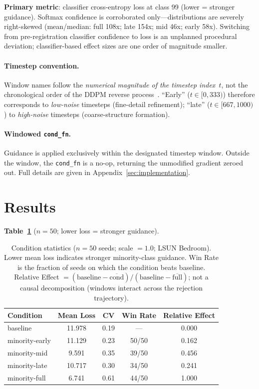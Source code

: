 \documentclass[10pt]{article}
\begin{document}
\textbf{Primary metric}: classifier cross-entropy loss at class 99 (lower =
stronger guidance).  Softmax confidence is corroborated only---distributions are
severely right-skewed (mean/median: full 108x; late 154x; mid 46x; early 58x).
Switching from pre-registration classifier confidence to loss is an unplanned
procedural deviation; classifier-based effect sizes are one order of magnitude
smaller.

\paragraph{Timestep convention.}
Window names follow the \emph{numerical magnitude of the timestep
index~$t$}, not the chronological order of the DDPM reverse
process~\cite{ho2020ddpm}.  ``Early'' ($t\!\in\![0,333)$) therefore
corresponds to \emph{low-noise} timesteps (fine-detail refinement);
``late'' ($t\!\in\![667,1000)$) to \emph{high-noise} timesteps
(coarse-structure formation).

\paragraph{Windowed \texttt{cond\_fn}.}
Guidance is applied exclusively within the designated timestep window.
Outside the window, the \texttt{cond\_fn} is a no-op, returning the unmodified
gradient zeroed out.  Full details are given in Appendix~\ref{sec:implementation}.

\section{Results}
\label{sec:results}

\textbf{Table~\ref{tab:conditions}} ($n=50$; lower loss = stronger guidance).

\begin{table}[h]
\centering
\caption{Condition statistics ($n=50$ seeds; scale $= 1.0$; LSUN Bedroom).
Lower mean loss indicates stronger minority-class guidance.
Win Rate is the fraction of seeds on which the condition beats baseline.
Relative Effect $= (\text{baseline} - \overline{\text{cond}}) /
(\text{baseline} - \overline{\text{full}})$;
not a causal decomposition (windows interact across the rejection trajectory).}
\label{tab:conditions}
\renewcommand{\arraystretch}{1.1}
\begin{tabular}{@{}lcccc@{}}
\toprule
\textbf{Condition} & \textbf{Mean Loss} & \textbf{CV} &
  \textbf{Win Rate} & \textbf{Relative Effect} \\
\midrule
baseline        & 11.978 & 0.19 & ---   & 0.000 \\
minority-early  & 11.129 & 0.23 & 50/50 & 0.162 \\
minority-mid    &  9.591 & 0.35 & 39/50 & 0.456 \\
minority-late   & 10.717 & 0.30 & 34/50 & 0.241 \\
minority-full   &  6.741 & 0.61 & 44/50 & 1.000 \\
\bottomrule
\end{tabular}
\end{table}
\end{document}

